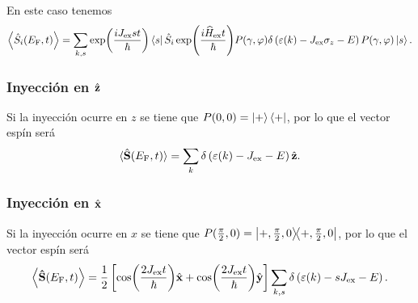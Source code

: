 En este caso tenemos
\begin{equation}\label{eq:S_EV:magZpre}
	\expval{\hat{S}_i(E_{\rm{F}},t)} = \sum_{k, s} \exp(\frac{i J_{\rm ex }s t}{\hbar}) \bra{ s}\hat{S}_i \exp(\frac{i\widehat{H}_{\rm ex}t}{\hbar})P(\gamma,\varphi) \delta\left (\varepsilon(k) -J_{\rm ex} \sigma_z  -E\right)P(\gamma,\varphi)\ket{s}.
\end{equation}

\subsubsection{Inyección en $ \hat{\vb z} $}
Si la inyección ocurre en $z$ se tiene que $P(0,0)=\ket{+}\bra{+}$, por lo que el vector espín será 
\begin{equation}
	\langle \hat{\vb{S} }(E_{\rm{F}},t) \rangle = \sum_k\delta\left (\varepsilon(k) -J_{\rm ex} -E\right) \hat{\vb z}.
\end{equation}

\subsubsection{Inyección en $ \hat{\vb x} $}
Si la inyección ocurre en $x$ se tiene que $P(\frac{\pi}{2},0) = \ketbra{+, \frac{\pi}{2}, 0}$, por lo que el vector espín será
\begin{equation}
	\expval{\vector{\hat{S}}(E_{\rm{F}},t)} = \frac{1}{2} \left[ \cos(\frac{2 J_{\rm ex } t}{\hbar}) \hat{\vector x} + \cos(\frac{2 J_{\rm ex } t}{\hbar}) \hat{\vector y} \right]  \smashoperator{\sum_{k, s}} \delta\left(\varepsilon(k) - sJ_{\rm ex} -E \right).
\end{equation}